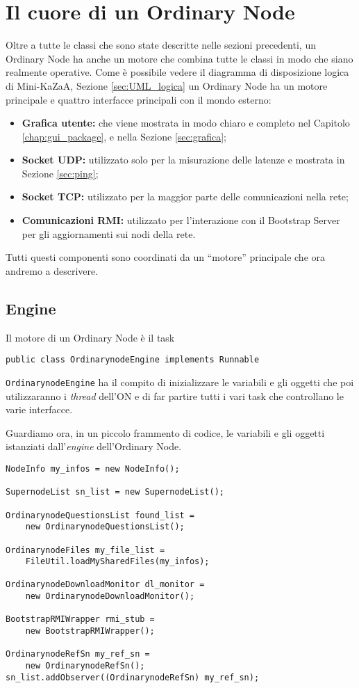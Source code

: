 \section{Il cuore di un Ordinary Node}
Oltre a tutte le classi che sono state descritte nelle sezioni precedenti, un Ordinary Node ha anche un motore che combina tutte le classi in modo che siano realmente operative.
Come è possibile vedere il diagramma di disposizione logica di Mini-KaZaA, Sezione \ref{sec:UML_logica}
un Ordinary Node ha un motore principale e quattro interfacce principali con il mondo esterno:
\begin{itemize}
 \item \textbf{Grafica utente:}
che viene mostrata in modo chiaro e completo nel Capitolo \ref{chap:gui_package}, e nella Sezione \ref{sec:grafica};

 \item \textbf{Socket UDP:}
utilizzato solo per la misurazione delle latenze e mostrata in Sezione \ref{sec:ping};
 
 \item \textbf{Socket TCP:} 
utilizzato per la maggior parte delle comunicazioni nella rete;

 \item \textbf{Comunicazioni RMI:}
utilizzato per l'interazione con il Bootstrap Server per gli aggiornamenti sui nodi della rete.
\end{itemize}

Tutti questi componenti sono coordinati da un ``motore'' principale che ora andremo a descrivere.

\subsection{Engine}
Il motore di un Ordinary Node è il task 
\begin{verbatim}
public class OrdinarynodeEngine implements Runnable
\end{verbatim}
\verb|OrdinarynodeEngine| ha il compito di inizializzare le variabili e gli oggetti che poi utilizzaranno i \emph{thread} dell'ON e di far partire tutti i vari task che controllano le varie interfacce.

Guardiamo ora, in un piccolo frammento di codice, le variabili e gli oggetti istanziati dall'\emph{engine} dell'Ordinary Node.
\begin{lstlisting}
NodeInfo my_infos = new NodeInfo();

SupernodeList sn_list = new SupernodeList();

OrdinarynodeQuestionsList found_list = 
	new OrdinarynodeQuestionsList();
	
OrdinarynodeFiles my_file_list = 
	FileUtil.loadMySharedFiles(my_infos);
	
OrdinarynodeDownloadMonitor dl_monitor = 
	new OrdinarynodeDownloadMonitor();

BootstrapRMIWrapper rmi_stub = 
	new BootstrapRMIWrapper();
	
OrdinarynodeRefSn my_ref_sn = 
	new OrdinarynodeRefSn();
sn_list.addObserver((OrdinarynodeRefSn) my_ref_sn);

\end{lstlisting}

